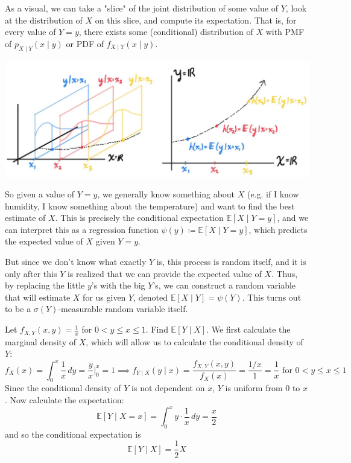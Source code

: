 \documentclass{article}
\begin{document}
    As a visual, we can take a "slice" of the joint distribution of some value of $Y$, look at the distribution of $X$ on this slice, and compute its expectation. That is, for every value of $Y = y$, there exists some (conditional) distribution of $X$ with PMF of $p_{X \mid Y} (x \mid y)$ or PDF of $f_{X \mid Y} (x \mid y)$. 
    \begin{center}
      \includegraphics[scale=0.3]{img/conditional_exp.jpg}
    \end{center}
    So given a value of $Y = y$, we generally know something about $X$ (e.g. if I know humidity, I know something about the temperature) and want to find the best estimate of $X$. This is precisely the conditional expectation $\mathbb{E}[X \mid Y = y]$, and we can interpret this as a regression function $\psi(y) \coloneqq \mathbb{E}[X \mid Y = y]$, which predicts the expected value of $X$ given $Y = y$. 

    But since we don't know what exactly $Y$ is, this process is random itself, and it is only after this $Y$ is realized that we can provide the expected value of $X$. Thus, by replacing the little $y$'s with the big $Y$'s, we can construct a random variable that will estimate $X$ for us given $Y$, denoted $\mathbb{E}[X \mid Y] = \psi(Y)$. This turns out to be a $\sigma(Y)$-measurable random variable itself. 

    \begin{example}
      Let $f_{X, Y} (x, y) = \frac{1}{x}$ for $0 < y \leq x \leq 1$. Find $\mathbb{E}[Y \mid X]$. We first calculate the marginal density of $X$, which will allow us to calculate the conditional density of $Y$: 
      \begin{equation}
        f_X (x) = \int_0^x \frac{1}{x} \,dy = \frac{y}{x} \bigg|_0^x = 1 \implies f_{Y \mid X} (y \mid x) = \frac{f_{X, Y} (x, y)}{f_X (x)} = \frac{1/x}{1} = \frac{1}{x} \text{ for } 0 < y \leq x \leq 1
      \end{equation}
      Since the conditional density of $Y$ is not dependent on $x$, $Y$ is uniform from $0$ to $x$. Now calculate the expectation: 
      \begin{equation}
        \mathbb{E}[Y \mid X = x] = \int_0^x y \cdot \frac{1}{x} \,dy = \frac{x}{2}
      \end{equation}
      and so the conditional expectation is 
      \begin{equation}
        \mathbb{E}[Y \mid X] = \frac{1}{2} X
      \end{equation}
    \end{example}
\end{document}

